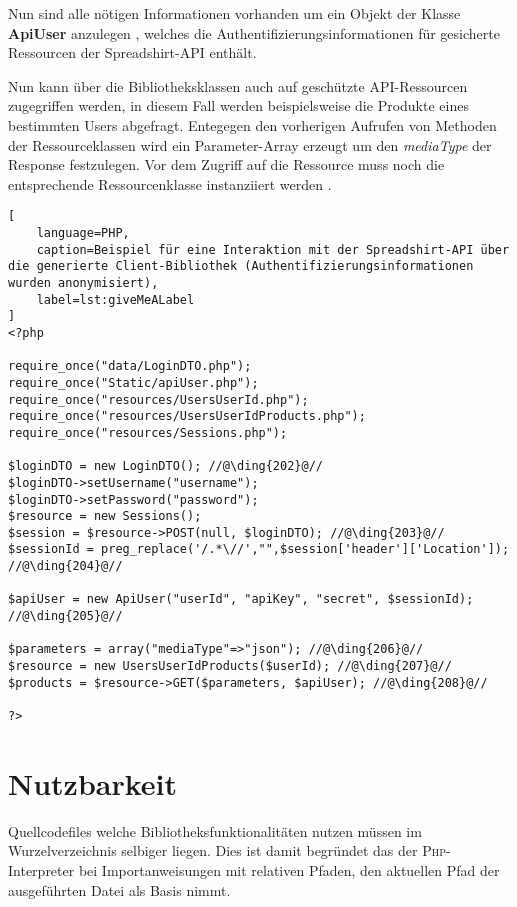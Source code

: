 Nun sind alle nötigen Informationen vorhanden um ein Objekt der Klasse \textbf{ApiUser} anzulegen , welches die Authentifizierungsinformationen für gesicherte Ressourcen der Spreadshirt-\gls{API} enthält.

Nun kann über die Bibliotheksklassen auch auf geschützte \gls{API}-Ressourcen zugegriffen werden, in diesem Fall werden beispielsweise die Produkte eines bestimmten Users abgefragt. Entegegen den vorherigen Aufrufen von Methoden der Ressourceklassen wird ein Parameter-Array erzeugt  um den \emph{mediaType} der Response festzulegen.
Vor dem Zugriff auf die Ressource muss noch die entsprechende Ressourcenklasse instanziiert werden .

\begin{minipage}{\textwidth}
\begin{lstlisting}[
    language=PHP,
    caption=Beispiel für eine Interaktion mit der Spreadshirt-API über die generierte Client-Bibliothek (Authentifizierungsinformationen wurden anonymisiert),
    label=lst:giveMeALabel
]
<?php

require_once("data/LoginDTO.php");
require_once("Static/apiUser.php");
require_once("resources/UsersUserId.php");
require_once("resources/UsersUserIdProducts.php");
require_once("resources/Sessions.php");

$loginDTO = new LoginDTO(); //@\ding{202}@//
$loginDTO->setUsername("username");
$loginDTO->setPassword("password");
$resource = new Sessions();
$session = $resource->POST(null, $loginDTO); //@\ding{203}@//
$sessionId = preg_replace('/.*\//',"",$session['header']['Location']); //@\ding{204}@//

$apiUser = new ApiUser("userId", "apiKey", "secret", $sessionId); //@\ding{205}@//

$parameters = array("mediaType"=>"json"); //@\ding{206}@//
$resource = new UsersUserIdProducts($userId); //@\ding{207}@//
$products = $resource->GET($parameters, $apiUser); //@\ding{208}@//

?>
\end{lstlisting}
\end{minipage}


\section{Nutzbarkeit}
\label{sec:usability}

Quellcodefiles welche Bibliotheksfunktionalitäten nutzen müssen im Wurzelverzeichnis selbiger liegen. Dies ist damit begründet das der \textsc{Php}-Interpreter bei Importanweisungen mit relativen Pfaden, den aktuellen Pfad der ausgeführten Datei als Basis nimmt.

